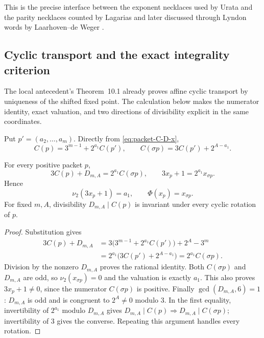 This is the precise interface between the exponent necklaces used by Urata
and the parity necklaces counted by Lagarias and later discussed through
Lyndon words by Laarhoven--de Weger
\cite{Lagarias1990,LaarhovenDeWeger2012,Urata2003}.

\subsection{Cyclic transport and the exact integrality criterion}

The local antecedent's Theorem~10.1 already proves affine cyclic transport
by uniqueness of the shifted fixed point.  The calculation below makes the
numerator identity, exact valuation, and two directions of divisibility
explicit in the same coordinates.

Put $p'=(a_2,\ldots,a_m)$.  Directly from
\eqref{eq:packet-C-D-x},
\[
 C(p)=3^{m-1}+2^{a_1}C(p'),
 \qquad
 C(\sigma p)=3C(p')+2^{A-a_1}.
\]

\begin{theorem}
\label{thm:cyclic-affine-transport}
For every positive packet $p$,
\begin{equation}
 3C(p)+D_{m,A}=2^{a_1}C(\sigma p),
 \qquad
 3x_p+1=2^{a_1}x_{\sigma p}.
 \label{eq:cyclic-affine-transport}
\end{equation}
Hence
\[
 \nu_2(3x_p+1)=a_1,
 \qquad \Phi(x_p)=x_{\sigma p}.
\]
For fixed $m,A$, divisibility $D_{m,A}\mid C(p)$ is invariant under every
cyclic rotation of $p$.
\end{theorem}

\begin{proof}
Substitution gives
\[
 \begin{aligned}
 3C(p)+D_{m,A}
 &=3\bigl(3^{m-1}+2^{a_1}C(p')\bigr)+2^A-3^m\\
 &=2^{a_1}\bigl(3C(p')+2^{A-a_1}\bigr)
 =2^{a_1}C(\sigma p).
 \end{aligned}
\]
Division by the nonzero $D_{m,A}$ proves the rational identity.  Both
$C(\sigma p)$ and $D_{m,A}$ are odd, so $\nu_2(x_{\sigma p})=0$ and the
valuation is exactly $a_1$.  This also proves $3x_p+1\ne0$, since the
numerator $C(\sigma p)$ is positive.  Finally $\gcd(D_{m,A},6)=1$:
$D_{m,A}$ is odd and is congruent to $2^A\ne0$ modulo $3$.
In the first equality, invertibility of $2^{a_1}$ modulo $D_{m,A}$ gives
$D_{m,A}\mid C(p)\Rightarrow D_{m,A}\mid C(\sigma p)$; invertibility
of $3$ gives the converse.  Repeating this argument handles every rotation.
\end{proof}

